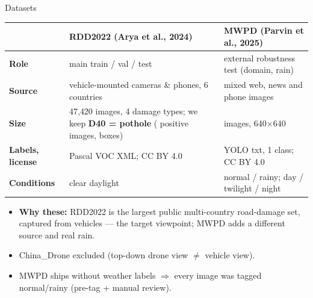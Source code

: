 \documentclass[aspectratio=169,11pt]{beamer}
\begin{document}
\begin{frame}{Datasets}
  \footnotesize
  \renewcommand{\arraystretch}{0.95}
  \begin{tabularx}{\textwidth}{@{}>{\bfseries}l X X@{}}
    \toprule
    & RDD2022 \normalfont(Arya et al., 2024) & MWPD \normalfont(Parvin et al., 2025) \\
    \midrule
    Role & main train / val / test & external robustness test (domain, rain) \\
    Source & vehicle-mounted cameras \& phones, 6 countries & mixed web, news and
      phone images \\
    Size & 47{,}420 images, 4 damage types; we keep \textbf{D40 = pothole}
      (\nRddPositive{} positive images, \nRddBoxes{} boxes) & \nMwpd{} images, 640$\times$640 \\
    Labels, license & Pascal VOC XML; CC BY 4.0 & YOLO txt, 1 class; CC BY 4.0 \\
    Conditions & clear daylight & normal / rainy; day / twilight / night \\
    \bottomrule
  \end{tabularx}

  \smallskip
  \begin{itemize}\scriptsize
    \setlength{\itemsep}{1pt}
    \item \textbf{Why these:} RDD2022 is the largest public multi-country road-damage set,
      captured from vehicles --- the target viewpoint; MWPD adds a different source and real rain.
    \item China\_Drone excluded (top-down drone view $\neq$ vehicle view).
    \item MWPD ships \alert{without weather labels} $\Rightarrow$ every image was tagged
      normal/rainy (pre-tag + manual review).
  \end{itemize}
\end{frame}
\end{document}
